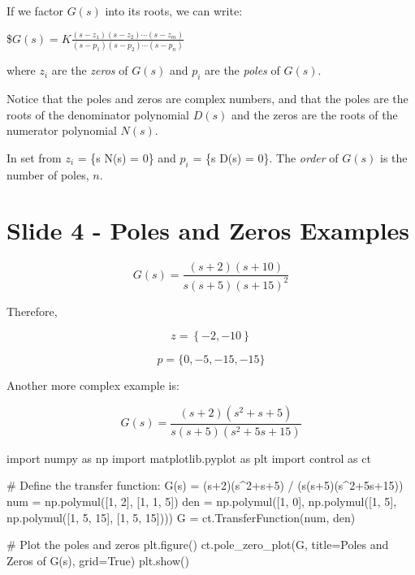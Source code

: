 \documentclass[
  letterpaper,
  DIV=11,
  numbers=noendperiod]{scrreprt}
\newenvironment{Shaded}{\begin{snugshade}}{\end{snugshade}}
\newcommand{\CommentTok}[1]{\textcolor[rgb]{0.37,0.37,0.37}{#1}}
\newcommand{\DecValTok}[1]{\textcolor[rgb]{0.68,0.00,0.00}{#1}}
\newcommand{\ImportTok}[1]{\textcolor[rgb]{0.00,0.46,0.62}{#1}}
\newcommand{\NormalTok}[1]{\textcolor[rgb]{0.00,0.23,0.31}{#1}}
\newcommand{\OperatorTok}[1]{\textcolor[rgb]{0.37,0.37,0.37}{#1}}
\newcommand{\StringTok}[1]{\textcolor[rgb]{0.13,0.47,0.30}{#1}}
\newcommand{\VariableTok}[1]{\textcolor[rgb]{0.07,0.07,0.07}{#1}}
\begin{document}
If we factor \(G(s)\) into its roots, we can write:

\$\(G(s) = K\frac{(s-z_1)(s-z_2)\cdots(s-z_m)}{(s-p_1)(s-p_2)\cdots(s-p_n)}\)

where \(z_i\) are the \emph{zeros} of \(G(s)\) and \(p_i\) are the
\emph{poles} of \(G(s)\).

Notice that the poles and zeros are complex numbers, and that the poles
are the roots of the denominator polynomial \(D(s)\) and the zeros are
the roots of the numerator polynomial \(N(s)\).

In set from \({z_i}\) = \{s \textbar{} N(s) = 0\} and \({p_i}\) = \{s
\textbar{} D(s) = 0\}. The \emph{order} of \(G(s)\) is the number of
poles, \(n\).

\section{Slide 4 - Poles and Zeros
Examples}\label{slide-4---poles-and-zeros-examples}

\[G(s) = \frac{(s+2)(s+10)}{s(s+5)(s+15)^2}\]

Therefore,

\[z = \left\{ -2, -10 \right\}\]

\[p = \{0, -5, -15, -15\}\]

Another more complex example is:

\[ G(s) = \frac{(s + 2)(s^2 + s + 5)}{s (s + 5)(s^2 + 5s + 15)}\]

\begin{Shaded}
\begin{Highlighting}[]
\ImportTok{import}\NormalTok{ numpy }\ImportTok{as}\NormalTok{ np}
\ImportTok{import}\NormalTok{ matplotlib.pyplot }\ImportTok{as}\NormalTok{ plt}
\ImportTok{import}\NormalTok{ control }\ImportTok{as}\NormalTok{ ct}

\CommentTok{\# Define the transfer function: G(s) = (s+2)(s\^{}2+s+5) / (s(s+5)(s\^{}2+5s+15))}
\NormalTok{num }\OperatorTok{=}\NormalTok{ np.polymul([}\DecValTok{1}\NormalTok{, }\DecValTok{2}\NormalTok{], [}\DecValTok{1}\NormalTok{, }\DecValTok{1}\NormalTok{, }\DecValTok{5}\NormalTok{])}
\NormalTok{den }\OperatorTok{=}\NormalTok{ np.polymul([}\DecValTok{1}\NormalTok{, }\DecValTok{0}\NormalTok{], np.polymul([}\DecValTok{1}\NormalTok{, }\DecValTok{5}\NormalTok{], np.polymul([}\DecValTok{1}\NormalTok{, }\DecValTok{5}\NormalTok{, }\DecValTok{15}\NormalTok{], [}\DecValTok{1}\NormalTok{, }\DecValTok{5}\NormalTok{, }\DecValTok{15}\NormalTok{])))}
\NormalTok{G }\OperatorTok{=}\NormalTok{ ct.TransferFunction(num, den)}

\CommentTok{\# Plot the poles and zeros}
\NormalTok{plt.figure()}
\NormalTok{ct.pole\_zero\_plot(G, title}\OperatorTok{=}\StringTok{\textquotesingle{}Poles and Zeros of G(s)\textquotesingle{}}\NormalTok{, grid}\OperatorTok{=}\VariableTok{True}\NormalTok{)}
\NormalTok{plt.show()}
\end{Highlighting}
\end{Shaded}
\end{document}
